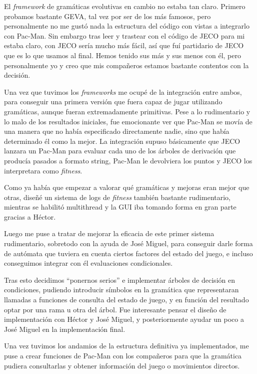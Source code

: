 El \textit{framework} de gramáticas evolutivas en cambio no estaba tan claro. Primero probamos bastante GEVA, tal vez por ser de los más famosos, pero personalmente no me gustó nada la estructura del código con vistas a integrarlo con Pac-Man. Sin embargo tras leer y trastear con el código de JECO para mi estaba claro, con JECO sería mucho más fácil, así que fuí partidario de JECO que es lo que usamos al final. Hemos tenido sus más y sus menos con él, pero personalmente yo y creo que mis compañeros estamos bastante contentos con la decisión.

Una vez que tuvimos los \textit{frameworks} me ocupé de la integración entre ambos, para conseguir una primera versión que fuera capaz de jugar utilizando gramáticas, aunque fueran extremadamente primitivas. Pese a lo rudimentario y lo malo de los resultados iniciales, fue emocionante ver que Pac-Man se movía de una manera que no había especificado directamente nadie, sino que había determinado él como la mejor. La integración supuso básicamente que JECO lanzara un Pac-Man para evaluar cada uno de los árboles de derivación que producía pasados a formato string, Pac-Man le devolviera los puntos y JECO los interpretara como \textit{fitness}.

Como ya había que empezar a valorar qué gramáticas y mejoras eran mejor que otras, diseñé un sistema de logs de \textit{fitness} también bastante rudimentario, mientras se habilitó multithread y la GUI iba tomando forma en gran parte gracias a Héctor.

Luego me puse a tratar de mejorar la eficacia de este primer sistema rudimentario, sobretodo con la ayuda de José Miguel, para conseguir darle forma de autómata que tuviera en cuenta ciertos factores del estado del juego, e incluso conseguimos integrar con él evaluaciones condicionales.

Tras esto decidimos ``ponernos serios'' e implementar árboles de decisión en condiciones, pudiendo introducir símbolos en la gramática que representaran llamadas a funciones de consulta del estado de juego, y en función del resultado optar por una rama u otra del árbol. Fue interesante pensar el diseño de implementación con Héctor y José Miguel, y posteriormente ayudar un poco a José Miguel en la implementación final.

Una vez tuvimos los andamios de la estructura definitiva ya implementados, me puse a crear funciones de Pac-Man con los compañeros para que la gramática pudiera consultarlas y obtener información del juego o movimientos directos.

